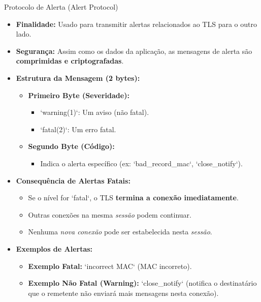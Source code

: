 \begin{frame}{Protocolo de Alerta (Alert Protocol)}
    \begin{itemize}
        \item \textbf{Finalidade:}  Usado para transmitir alertas relacionados ao TLS para o outro lado.


        \item \textbf{Segurança:} Assim como os dados da aplicação, as mensagens de alerta são \textbf{comprimidas e criptografadas}.


        \item \textbf{Estrutura da Mensagem (2 bytes):}
              \begin{itemize}
                  \item \textbf{Primeiro Byte (Severidade):}
                        \begin{itemize}
                            \item `warning(1)`: Um aviso (não fatal).
                            \item `fatal(2)`: Um erro fatal.
                        \end{itemize}
                  \item \textbf{Segundo Byte (Código):}
                        \begin{itemize}
                            \item Indica o alerta específico (ex: `bad\_record\_mac`, `close\_notify`).
                        \end{itemize}
              \end{itemize}

        \item \textbf{Consequência de Alertas Fatais:}
              \begin{itemize}
                  \item Se o nível for `fatal`, o TLS \textbf{termina a conexão imediatamente}.
                  \item Outras conexões na mesma \textit{sessão} podem continuar.
                  \item Nenhuma \textit{nova conexão} pode ser estabelecida nesta \textit{sessão}.
              \end{itemize}

        \item \textbf{Exemplos de Alertas:}
              \begin{itemize}
                  \item \textbf{Exemplo Fatal:} `incorrect MAC` (MAC incorreto).
                  \item \textbf{Exemplo Não Fatal (Warning):} `close\_notify` (notifica o destinatário que o remetente não enviará mais mensagens nesta conexão).
              \end{itemize}
    \end{itemize}
\end{frame}

